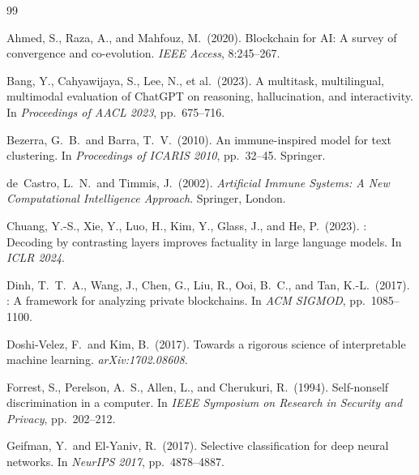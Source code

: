 \documentclass[11pt,a4paper]{article}
\begin{document}
\begin{thebibliography}{99}

Ahmed, S., Raza, A., and Mahfouz, M.\ (2020).
\newblock Blockchain for AI: A survey of convergence and co-evolution.
\newblock \textit{IEEE Access}, 8:245–267.

Bang, Y., Cahyawijaya, S., Lee, N., et al.\ (2023).
\newblock A multitask, multilingual, multimodal evaluation of {ChatGPT} on
  reasoning, hallucination, and interactivity.
\newblock In \textit{Proceedings of AACL 2023}, pp.\ 675--716.

Bezerra, G.~B.\ and Barra, T.~V.\ (2010).
\newblock An immune-inspired model for text clustering.
\newblock In \textit{Proceedings of ICARIS 2010}, pp.\ 32--45. Springer.

de~Castro, L.~N.\ and Timmis, J.\ (2002).
\newblock \textit{Artificial Immune Systems: A New Computational Intelligence
  Approach}.
\newblock Springer, London.

Chuang, Y.-S., Xie, Y., Luo, H., Kim, Y., Glass, J., and He, P.\ (2023).
: Decoding by contrasting layers improves factuality in large
  language models.
\newblock In \textit{ICLR 2024}.

Dinh, T.~T.~A., Wang, J., Chen, G., Liu, R., Ooi, B.~C., and Tan, K.-L.\
  (2017).
: A framework for analyzing private blockchains.
\newblock In \textit{ACM SIGMOD}, pp.\ 1085--1100.

Doshi-Velez, F.\ and Kim, B.\ (2017).
\newblock Towards a rigorous science of interpretable machine learning.
\newblock \textit{arXiv:1702.08608}.

Forrest, S., Perelson, A.~S., Allen, L., and Cherukuri, R.\ (1994).
\newblock Self-nonself discrimination in a computer.
\newblock In \textit{IEEE Symposium on Research in Security and Privacy},
  pp.\ 202--212.

Geifman, Y.\ and El-Yaniv, R.\ (2017).
\newblock Selective classification for deep neural networks.
\newblock In \textit{NeurIPS 2017}, pp.\ 4878--4887.


\end{thebibliography}
\end{document}
